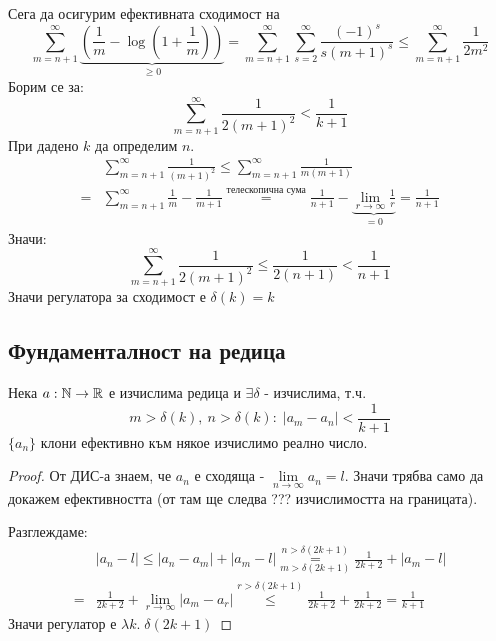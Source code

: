 Сега да осигурим ефективната сходимост на 
\begin{equation}
    \sum\limits_{m=n+1}^\infty \underbrace{\left( \frac{1}{m} - \log \left( 1+ \frac{1}{m} \right)\right)}_{\geq0} = \sum\limits_{m=n+1}^\infty \sum\limits_{s=2}^\infty \frac{(-1)^s}{s(m+1)^s} \leq \sum\limits_{m=n+1}^\infty \frac{1}{2m^2}
\end{equation}
Борим се за:
\begin{equation}
    \sum\limits_{m=n+1}^\infty \frac{1}{2(m+1)^2} < \frac{1}{k+1}
\end{equation}
При дадено $k$ да определим $n$.
\begin{equation*}
    \begin{split}
        & \sum\limits_{m=n+1}^\infty \frac{1}{(m+1)^2} \leq \sum\limits_{m=n+1}^\infty \frac{1}{m(m+1)} \\
        = & \sum\limits_{m=n+1}^\infty \frac{1}{m} - \frac{1}{m+1} \overset{\text{телескопична сума}}{=} \frac{1}{n+1} - \underbrace{\lim\limits_{r \to \infty} \frac{1}{r}}_{=0} = \frac{1}{n+1}
    \end{split}
\end{equation*}
Значи:
\begin{equation}
    \sum\limits_{m=n+1}^\infty \frac{1}{2(m+1)^2} \leq \frac{1}{2(n+1)} < \frac{1}{n+1}
\end{equation}
Значи регулатора за сходимост е $\delta(k) = k$

\subsection{Фундаменталност на редица}
\begin{proposition}
    Нека $a: {\mathbb{N}} \to {\mathbb{R}}$ е изчислима редица и $\exists \delta$ - изчислима, т.ч. 
    \begin{equation}
        m > \delta(k),\ n > \delta(k):\; |a_m - a_n| < \frac{1}{k+1}
    \end{equation}
    $\{a_n\}$ клони ефективно към някое изчислимо реално число.
\end{proposition}
\begin{proof}
    От ДИС-а знаем, че $a_n$ е сходяща - $\lim\limits_{n \to\infty} a_n = l$. Значи трябва само да докажем ефективността (от там ще следва ??? изчислимостта на границата).

    Разглеждаме:
    \begin{equation}
        \begin{split}
            & |a_n - l| \leq |a_n - a_m| + |a_m - l| \overset{n > \delta(2k+1)}{\underset{m > \delta(2k+1)}{=}} \frac{1}{2k+2} + |a_m - l| \\
            = & \frac{1}{2k+2} + \lim\limits_{r\to\infty}|a_m - a_r| \overset{r > \delta(2k+1)}{\leq} \frac{1}{2k+2} + \frac{1}{2k+2} = \frac{1}{k+1}
        \end{split}
    \end{equation}
    Значи регулатор е $\lambda k.\;\delta(2k+1)$
\end{proof}

